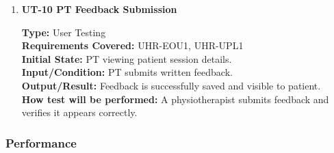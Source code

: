 \documentclass[12pt, titlepage]{article}
\begin{document}
\begin{enumerate}
\vspace{0.5em}

\item \textbf{UT-10 PT Feedback Submission}

\textbf{Type:} User Testing \\
\textbf{Requirements Covered:} UHR-EOU1, UHR-UPL1\\
\textbf{Initial State:} PT viewing patient session details. \\
\textbf{Input/Condition:} PT submits written feedback. \\
\textbf{Output/Result:} Feedback is successfully saved and visible to patient. \\
\textbf{How test will be performed:} A physiotherapist submits feedback and verifies it appears correctly. \\

\end{enumerate}	

\subsubsection{Performance}
\end{document}
